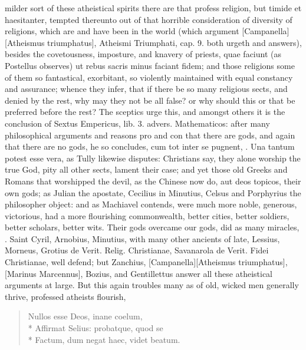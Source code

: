 {milder sort of these atheistical spirits there are that profess
religion, but timide et haesitanter, tempted thereunto out of that
horrible consideration of diversity of religions, which are and have
been in the world (which argument [Campanella][\textlatin{Atheismus triumphatus}], Atheismi Triumphati, cap.
9. both urgeth and answers), besides the covetousness, imposture, and
knavery of priests, quae faciunt (as Postellus observes) ut rebus
sacris minus faciant fidem; and those religions some of them so
fantastical, exorbitant, so violently maintained with equal constancy
and assurance; whence they infer, that if there be so many religious
sects, and denied by the rest, why may they not be all false? or why
should this or that be preferred before the rest? The sceptics urge
this, and amongst others it is the conclusion of Sextus Empericus, lib.
3. advers. Mathematicos: after many philosophical arguments and reasons
pro and con that there are gods, and again that there are no gods, he
so concludes, cum tot inter se pugnent, \etc{}. Una tantum potest esse
vera, as Tully likewise disputes: Christians say, they alone worship
the true God, pity all other sects, lament their case; and yet those
old Greeks and Romans that worshipped the devil, as the Chinese now do,
aut deos topicos, their own gods; as Julian the apostate,
Cecilius in Minutius, Celsus and Porphyrius the philosopher
object: and as Machiavel contends, were much more noble, generous,
victorious, had a more flourishing commonwealth, better cities, better
soldiers, better scholars, better wits. Their gods overcame our gods,
did as many miracles, \etc{}. Saint Cyril, Arnobius, Minutius, with many
other ancients of late, Lessius, Morneus, Grotius de Verit. Relig.
Christianae, Savanarola de Verit. Fidei Christianae, well defend; but
Zanchius, [Campanella][\textlatin{Atheismus triumphatus}], [Marinus Marcennus], Bozius, and Gentillettus
answer all these atheistical arguments at large. But this again
troubles many as of old, wicked men generally thrive, professed
atheists flourish,

\begin{latin}
\begin{verse}
Nullos esse Deos, inane coelum,\\*
Affirmat Selius: probatque, quod se\\*
Factum, dum negat haec, videt beatum.
\end{verse}
\end{latin}

}
